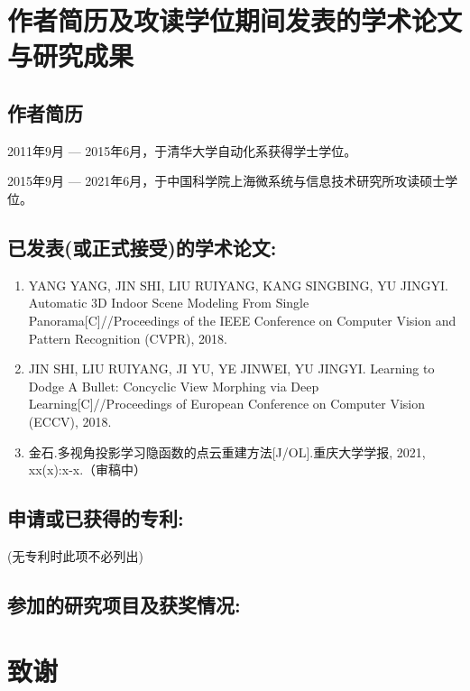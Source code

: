 \chapter{作者简历及攻读学位期间发表的学术论文与研究成果}

\section*{作者简历}

\noindent 2011年9月 --- 2015年6月，于清华大学自动化系获得学士学位。

\noindent 2015年9月 --- 2021年6月，于中国科学院上海微系统与信息技术研究所攻读硕士学位。

\section*{已发表(或正式接受)的学术论文:}

{
\setlist[enumerate]{}%
\begin{enumerate}[nosep]
    \item YANG YANG, JIN SHI, LIU RUIYANG, KANG SINGBING, YU JINGYI. Automatic 3D Indoor Scene Modeling From Single Panorama[C]//Proceedings of the IEEE Conference on Computer Vision and Pattern Recognition (CVPR), 2018.
    \item  JIN SHI, LIU RUIYANG, JI YU, YE JINWEI, YU JINGYI. Learning to Dodge A Bullet: Concyclic View Morphing via Deep Learning[C]//Proceedings of European Conference on Computer Vision (ECCV), 2018.
    \item 金石.多视角投影学习隐函数的点云重建方法[J/OL].重庆大学学报, 2021, xx(x):x-x.（审稿中）
\end{enumerate}
}

\section*{申请或已获得的专利:}

(无专利时此项不必列出)

\section*{参加的研究项目及获奖情况:}



\chapter[致谢]{致\quad 谢}%
\thispagestyle{noheaderstyle}%

